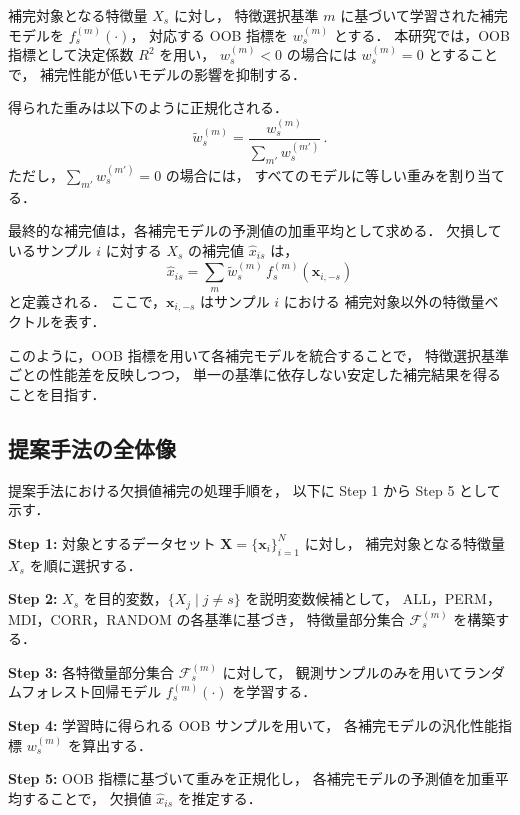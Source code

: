 補完対象となる特徴量 $X_s$ に対し，
特徴選択基準 $m$ に基づいて学習された補完モデルを
$f_s^{(m)}(\cdot)$，
対応する OOB 指標を $w_s^{(m)}$ とする．
本研究では，OOB 指標として決定係数 $R^2$ を用い，
$w_s^{(m)} < 0$ の場合には $w_s^{(m)} = 0$ とすることで，
補完性能が低いモデルの影響を抑制する．

得られた重みは以下のように正規化される．
\begin{equation}
\label{eq:weight_norm}
\tilde{w}_s^{(m)} =
\frac{w_s^{(m)}}{\sum_{m'} w_s^{(m')}} \, .
\end{equation}
ただし，$\sum_{m'} w_s^{(m')} = 0$ の場合には，
すべてのモデルに等しい重みを割り当てる．

最終的な補完値は，各補完モデルの予測値の加重平均として求める．
欠損しているサンプル $i$ に対する $X_s$ の補完値 $\hat{x}_{is}$ は，
\begin{equation}
\label{eq:imputation}
\hat{x}_{is}
=
\sum_m \tilde{w}_s^{(m)} \,
f_s^{(m)}(\mathbf{x}_{i,-s})
\end{equation}
と定義される．
ここで，$\mathbf{x}_{i,-s}$ はサンプル $i$ における
補完対象以外の特徴量ベクトルを表す．

このように，OOB 指標を用いて各補完モデルを統合することで，
特徴選択基準ごとの性能差を反映しつつ，
単一の基準に依存しない安定した補完結果を得ることを目指す．



\subsection{提案手法の全体像}

提案手法における欠損値補完の処理手順を，
以下に Step 1 から Step 5 として示す．

\noindent
\textbf{Step 1:}  
対象とするデータセット $\mathbf{X}=\{\mathbf{x}_i\}_{i=1}^N$ に対し，
補完対象となる特徴量 $X_s$ を順に選択する．

\noindent
\textbf{Step 2:}  
$X_s$ を目的変数，$\{X_j \mid j \neq s\}$ を説明変数候補として，
ALL，PERM，MDI，CORR，RANDOM の各基準に基づき，
特徴量部分集合 $\mathcal{F}_s^{(m)}$ を構築する．

\noindent
\textbf{Step 3:}  
各特徴量部分集合 $\mathcal{F}_s^{(m)}$ に対して，
観測サンプルのみを用いてランダムフォレスト回帰モデル
$f_s^{(m)}(\cdot)$ を学習する．

\noindent
\textbf{Step 4:}  
学習時に得られる OOB サンプルを用いて，
各補完モデルの汎化性能指標 $w_s^{(m)}$ を算出する．

\noindent
\textbf{Step 5:}  
OOB 指標に基づいて重みを正規化し，
各補完モデルの予測値を加重平均することで，
欠損値 $\hat{x}_{is}$ を推定する．


